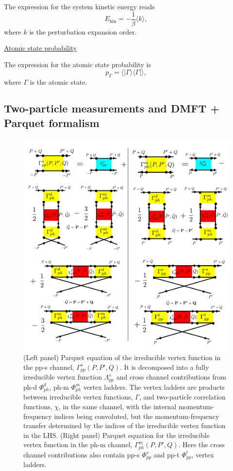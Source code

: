 The expression for the system kinetic energy reads
\begin{equation}
\label{eq:kin}
E_\text{kin} = -\frac{1}{\beta} \langle k \rangle,
\end{equation}
where $k$ is the perturbation expansion order.

\underline{Atomic state probability}

The expression for the atomic state probability is 
\begin{equation}
p_{\Gamma} = \langle |\Gamma \rangle \langle \Gamma| \rangle,
\end{equation}
where $\Gamma$ is the atomic state.

\subsection{Two-particle measurements and DMFT + Parquet formalism\label{subsec:parquet}}

\begin{figure}[tp]
\centering
\includegraphics[width=\textwidth]{figure/parquet_pp_s_ph_m.pdf}
\caption{(Left panel) Parquet equation of the irreducible vertex function in the pp-s channel, $\Gamma^{s}_{pp}(P,P',Q)$. It is decomposed into a fully irreducible vertex function $\Lambda^{s}_{pp}$ and cross channel contributions from ph-d $\Phi^{d}_{ph}$, ph-m $\Phi^{m}_{ph}$ vertex ladders. The vertex ladders are products between irreducible vertex functions, $\Gamma$, and two-particle correlation functions, $\chi$, in the same channel, with the internal momentum-frequency indices being convoluted, but the momentum-frequency transfer determined by the indices of the irreducible vertex function in the LHS. (Right panel) Parquet equation for the irreducible vertex function in the ph-m channel, $\Gamma^{m}_{ph}(P,P',Q)$. Here the cross channel contributions also contain pp-s $\Phi^{s}_{pp}$ and pp-t $\Phi^{t}_{pp}$, vertex ladders.} \label{fig:parquet_pp_ph}
\end{figure}

